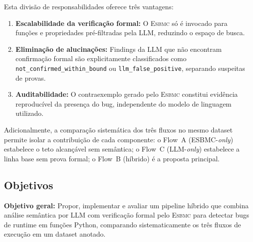 \documentclass[conference]{IEEEtran}
\newcommand{\esbmc}{\textsc{Esbmc}}
\newcommand{\flowA}{Flow~A}
\newcommand{\flowB}{Flow~B}
\newcommand{\flowC}{Flow~C}
\begin{document}
Esta divisão de responsabilidades oferece três vantagens:
\begin{enumerate}
  \item \textbf{Escalabilidade da verificação formal:} O \esbmc{} só é
    invocado para funções e propriedades pré-filtradas pela LLM, reduzindo
    o espaço de busca.
  \item \textbf{Eliminação de alucinações:} Findings da LLM que não
    encontram confirmação formal são explicitamente classificados como
    \texttt{not\_confirmed\_within\_bound} ou \texttt{llm\_false\_positive},
    separando suspeitas de provas.
  \item \textbf{Auditabilidade:} O contraexemplo gerado pelo \esbmc{}
    constitui evidência reproducível da presença do bug, independente
    do modelo de linguagem utilizado.
\end{enumerate}

Adicionalmente, a comparação sistemática dos três fluxos no mesmo dataset
permite isolar a contribuição de cada componente:
o \flowA{} (ESBMC-\textit{only}) estabelece o teto alcançável sem
semântica; o \flowC{} (LLM-\textit{only}) estabelece a linha base sem
prova formal; o \flowB{} (híbrido) é a proposta principal.

\subsection{Objetivos}
\label{sec:objetivos}

\textbf{Objetivo geral:} Propor, implementar e avaliar um pipeline
híbrido que combina análise semântica por LLM com verificação formal
pelo \esbmc{} para detectar bugs de runtime em funções Python, comparando
sistematicamente os três fluxos de execução em um dataset anotado.
\end{document}
